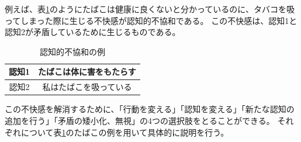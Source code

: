 \documentclass{kuisthesis}
\begin{document}
例えば、表\ref{fig: CDTExample}のようにたばこは健康に良くないと分かっているのに、タバコを吸ってしまった際に生じる不快感が認知的不協和である。
この不快感は、認知1と認知2が矛盾しているために生じるものである。
\begin{table}[H]
  \centering\caption{認知的不協和の例}
  \label{fig: CDTExample}

  \begin{tabular}{c|c}
      認知1 & たばこは体に害をもたらす  \\ \hline
      認知2 & 私はたばこを吸っている \\ 
  \end{tabular}
  
\end{table}
この不快感を解消するために、「行動を変える」「認知を変える」「新たな認知の追加を行う」「矛盾の矮小化、無視」の4つの選択肢をとることができる。
それぞれについて表\ref{fig: CDTExample}のたばこの例を用いて具体的に説明を行う。
\end{document}
